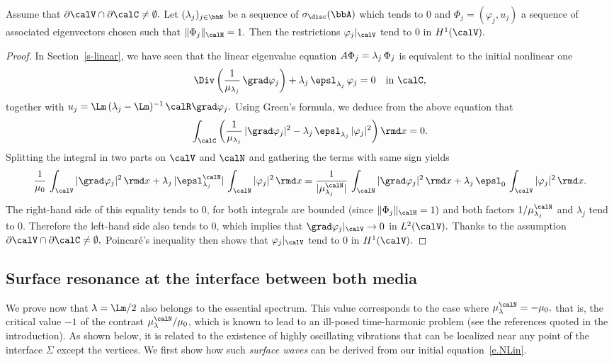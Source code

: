 \begin{prop}\label{prop3.4}
Assume that $\partial\calV \cap \partial\calC \neq \emptyset.$ Let $(\lambda_j)_{j \in \bbN}$ be a sequence of $\sigma_{\disc}(\bbA)$ which tends to $0$ and $\Phi_j = (\varphi_j,u_j)$ a sequence of associated eigenvectors chosen such that $\| \Phi_j \|_\calH = 1.$ Then the restrictions $\varphi_j|_\calV$ tend to $0$ in $H^1(\calV).$
\end{prop}

\begin{proof}
In Section~\ref{s-linear}, we have seen that the linear eigenvalue equation $A \Phi_j\linebreak= \lambda_j\,\Phi_j$ is equivalent to the initial nonlinear one
\[
\Div \left(\frac{1}{\mu_{\lambda_j}}\, \grad\varphi_j \right) + \lambda_j\,\epsl_{\lambda_j}\,\varphi_j = 0
\quad\text{in }\calC,
\]
together with $u_j = \Lm \, (\lambda_j-\Lm)^{-1} \, \calR \grad\varphi_j.$ Using Green's formula, we deduce from the above equation that
\[
\int_\calC \left(\frac{1}{\mu_{\lambda_j}}\, |\grad\varphi_j|^2 - \lambda_j\,\epsl_{\lambda_j}\,|\varphi_j|^2 \right) \rmd x = 0.
\]
Splitting the integral in two parts on $\calV$ and $\calN$ and gathering the terms with same sign yields
\[
\frac{1}{\mu_0}\,\int_\calV |\grad\varphi_j|^2 \,\rmd x +
\lambda_j\,|\epsl^\calN_{\lambda_j}| \,\int_\calN |\varphi_j|^2 \,\rmd x = \frac{1}{|\mu^\calN_{\lambda_j}|}\,\int_\calN |\grad\varphi_j|^2 \,\rmd x +
\lambda_j\,\epsl_0 \,\int_\calV |\varphi_j|^2 \,\rmd x.
\]
The right-hand side of this equality tends to 0, for both integrals are bounded (since $\| \Phi_j \|_\calH = 1)$ and both factors $1/\mu^\calN_{\lambda_j}$ and $\lambda_j$ tend to 0. Therefore the left-hand side also tends to 0, which implies that $\grad\varphi_j|_\calV \to 0$ in $L^2(\calV).$ Thanks to the assumption $\partial\calV \cap \partial\calC \neq \emptyset,$ Poincaré's inequality then shows that $\varphi_j|_\calV$ tend to $0$ in $H^1(\calV).$
\end{proof}

\subsection{Surface resonance at the interface between both media}\label{s-surface-reson}
We prove now that $\lambda = \Lm/2$ also belongs to the essential spectrum. This value corresponds to the case where $\mu_\lambda^\calN = -\mu_0,$ that is, the critical value $-1$ of the contrast $\mu_\lambda^\calN/\mu_0$, which is known to lead to an ill-posed time-harmonic problem (see the references quoted in the introduction). As shown below, it is related to the existence of highly oscillating vibrations that can be localized near any point of the interface $\Sigma$ except the vertices. We first show how such \emph{surface waves} can be derived from our initial equation~\eqref{e.NLin}.


